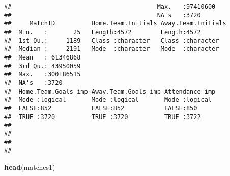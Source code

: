 \documentclass[]{article}
\newenvironment{Shaded}{\begin{snugshade}}{\end{snugshade}}
\newcommand{\KeywordTok}[1]{\textcolor[rgb]{0.13,0.29,0.53}{\textbf{#1}}}
\newcommand{\NormalTok}[1]{#1}
\begin{document}
\begin{verbatim}
##                                        Max.   :97410600  
##                                        NA's   :3720      
##     MatchID          Home.Team.Initials Away.Team.Initials
##  Min.   :       25   Length:4572        Length:4572       
##  1st Qu.:     1189   Class :character   Class :character  
##  Median :     2191   Mode  :character   Mode  :character  
##  Mean   : 61346868                                        
##  3rd Qu.: 43950059                                        
##  Max.   :300186515                                        
##  NA's   :3720                                             
##  Home.Team.Goals_imp Away.Team.Goals_imp Attendance_imp 
##  Mode :logical       Mode :logical       Mode :logical  
##  FALSE:852           FALSE:852           FALSE:850      
##  TRUE :3720          TRUE :3720          TRUE :3722     
##                                                         
##                                                         
##                                                         
## 
\end{verbatim}

\begin{Shaded}
\begin{Highlighting}[]
\KeywordTok{head}\NormalTok{(matches1)}
\end{Highlighting}
\end{Shaded}
\end{document}
